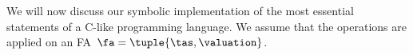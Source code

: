 We will now discuss our symbolic implementation of the most essential statements
of a C-like programming language. 
%
%
%
%
%
%
%
We assume that the operations are applied on an FA~$\fa = \tuple{\tas,\valuation}$.
